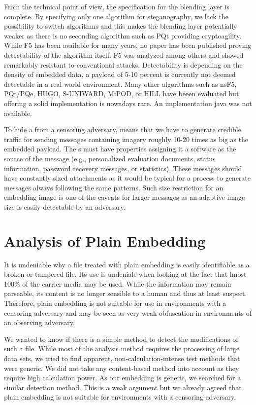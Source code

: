 From the technical point of view, the specification for the blending layer is complete. By specifying only one algorithm for steganography, we lack the possibility to switch algorithms and this makes the blending layer potentially weaker as there is no seconding algorithm such as PQt providing cryptoagility. While F5 has been available for many years, no paper has been published proving detectability of the algorithm itself. F5 was analyzed among others and showed remarkably resistant to conventional attacks. Detectability is depending on the density of embedded data, a payload of 5-10 percent is currently not deemed detectable in a real world environment\cite{fridrich2007statistically}. Many other algorithms such as nsF5, PQt/PQe, HUGO\cite{pevny2010using}, S-UNIWARD\cite{holub2014universal}, MiPOD\cite{sedighi2015content}, or HILL\cite{li2014new} have beeen evaluated but offering a solid implementation is nowadays rare. An implementation java was not available.

To hide a \VortexNode{} from a censoring adversary, means that we have to generate credible traffic for sending messages containing imagery roughly 10-20 times as big as the embedded payload. The s must have properties assigning it a software as the source of the message (e.g., personalized evaluation documents, status information, password recovery messages, or statistics). These messages should have constantly sized attachments as it would be typical for a process to generate messages always following the same patterns. Such size restriction for an embedding image is one of the caveats for larger messages as an adaptive image size is easily detectable by an adversary. 

\section{Analysis of Plain Embedding}
It is undeniable why a file treated with plain embedding is easily identifiable as a broken or tampered file. Its use is undeniale when looking at the fact that lmost 100\% of the carrier media may be used. While the information may remain parseable, its content is no longer sensible to a human and thus at least suspect. Therefore, plain embedding is not suitable for use in environments with a censoring adversary and may be seen as very weak obfuscation in environments of an observing adversary.

We wanted to know if there is a simple method to detect the modifications of such a file. While most of the analysis method requires the processing of large data sets, we tried to find apparent, non-calculation-intense test methods that were generic. We did not take any content-based method into account as they require high calculation power. As our embedding is generic, we searched for a similar detection method. This is a weak argument but we already agreed that plain embedding is not suitable for environments with a censoring adversary.

